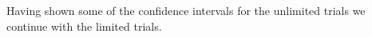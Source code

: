 Having shown some of the confidence intervals for the unlimited trials we continue with the limited trials.












